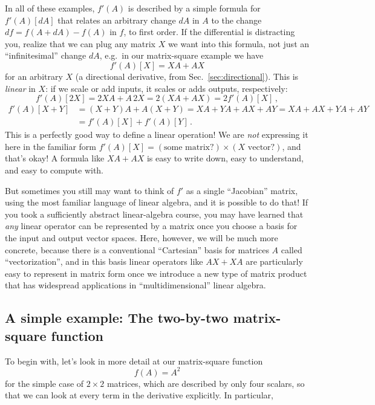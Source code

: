 In all of these examples, $f'(A)$ is described by a simple formula
for $f'(A)[dA]$ that relates an arbitrary change $dA$ in $A$ to
the change $df=f(A+dA)-f(A)$ in $f$, to first order. If the differential
is distracting you, realize that we can plug any matrix $X$ we want
into this formula, not just an ``infinitesimal'' change $dA$, e.g.~in
our matrix-square example we have 
\[
f'(A)[X]=XA+AX
\]
 for an arbitrary $X$ (a directional derivative, from Sec.~\ref{sec:directional}). This is \emph{linear} in $X$: if we scale
or add inputs, it scales or adds outputs, respectively:
\[
f'(A)[2X]=2XA+A\,2X=2(XA+AX)=2f'(A)[X]\,,
\]
\begin{align*}
f'(A)[X+Y] & =(X+Y)A+A(X+Y)=XA+YA+AX+AY=XA+AX+YA+AY\\
 & =f'(A)[X]+f'(A)[Y]\,.
\end{align*}
This is a perfectly good way to define a linear operation! We are
\emph{not} expressing it here in the familiar form $f'(A)[X]=(\text{some matrix?})\times(X\text{ vector?})$,
and that's okay! A formula like $XA+AX$ is easy to write down, easy
to understand, and easy to compute with. 

But sometimes you still may want to think of $f'$ as a single ``Jacobian''
matrix, using the most familiar language of linear algebra, and it
is possible to do that! If you took a sufficiently abstract linear-algebra
course, you may have learned that \emph{any} linear operator can be
represented by a matrix once you choose a basis for the input and
output vector spaces. Here, however, we will be much more concrete,
because there is a conventional ``Cartesian'' basis for matrices
$A$ called ``vectorization'', and in this basis linear operators
like $AX+XA$ are particularly easy to represent in matrix form once
we introduce a new type of matrix product that has widespread applications
in ``multidimensional'' linear algebra.

\subsection{A simple example: The two-by-two matrix-square function}

To begin with, let's look in more detail at our matrix-square function
\[
f(A)=A^{2}
\]
for the simple case of $2\times2$ matrices, which are described by
only four scalars, so that we can look at every term in the derivative
explicitly. In particular,

